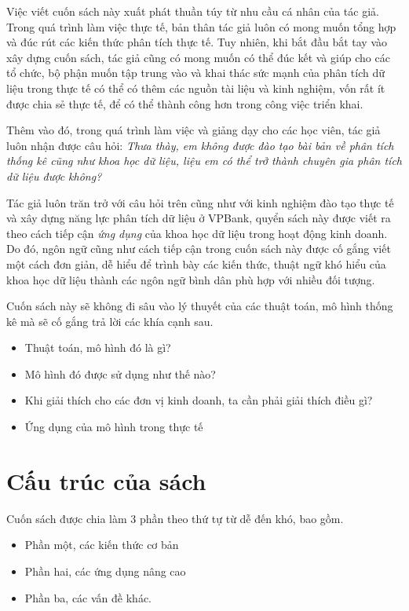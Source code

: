 \documentclass[]{krantz}
\providecommand{\tightlist}{%
  \setlength{\itemsep}{0pt}\setlength{\parskip}{0pt}}
\theoremstyle{definition}
\theoremstyle{definition}
\theoremstyle{definition}
\theoremstyle{remark}
\begin{document}
Việc viết cuốn sách này xuất phát thuần túy từ nhu cầu cá nhân của tác
giả. Trong quá trình làm việc thực tế, bản thân tác giả luôn có mong
muốn tổng hợp và đúc rút các kiến thức phân tích thực tế. Tuy nhiên, khi
bắt đầu bắt tay vào xây dựng cuốn sách, tác giả cũng có mong muốn có thể
đúc kết và giúp cho các tổ chức, bộ phận muốn tập trung vào và khai thác
sức mạnh của phân tích dữ liệu trong thực tế có thể có thêm các nguồn
tài liệu và kinh nghiệm, vốn rất ít được chia sẻ thực tế, để có thể
thành công hơn trong công việc triển khai.

Thêm vào đó, trong quá trình làm việc và giảng dạy cho các học viên, tác
giả luôn nhận được câu hỏi: \emph{Thưa thày, em không được đào tạo bài
bản về phân tích thống kê cũng như khoa học dữ liệu, liệu em có thể trở
thành chuyên gia phân tích dữ liệu được không?}

Tác giả luôn trăn trở với câu hỏi trên cũng như với kinh nghiệm đào tạo
thực tế và xây dựng năng lực phân tích dữ liệu ở VPBank, quyển sách này
được viết ra theo cách tiếp cận \emph{ứng dụng} của khoa học dữ liệu
trong hoạt động kinh doanh. Do đó, ngôn ngữ cũng như cách tiếp cận trong
cuốn sách này được cố gắng viết một cách đơn giản, dễ hiểu để trình bày
các kiến thức, thuật ngữ khó hiểu của khoa học dữ liệu thành các ngôn
ngữ bình dân phù hợp với nhiều đối tượng.

Cuốn sách này sẽ không đi sâu vào lý thuyết của các thuật toán, mô hình
thống kê mà sẽ cố gắng trả lời các khía cạnh sau.

\begin{itemize}
\tightlist
\item
  Thuật toán, mô hình đó là gì?
\item
  Mô hình đó được sử dụng như thế nào?
\item
  Khi giải thích cho các đơn vị kinh doanh, ta cần phải giải thích điều
  gì?
\item
  Ứng dụng của mô hình trong thực tế
\end{itemize}

\hypertarget{cu-truc-cua-sach}{%
\section*{Cấu trúc của sách}\label{cu-truc-cua-sach}}


Cuốn sách được chia làm 3 phần theo thứ tự từ dễ đến khó, bao gồm.

\begin{itemize}
\tightlist
\item
  Phần một, các kiến thức cơ bản
\item
  Phần hai, các ứng dụng nâng cao
\item
  Phần ba, các vấn đề khác.
\end{itemize}
\end{document}
